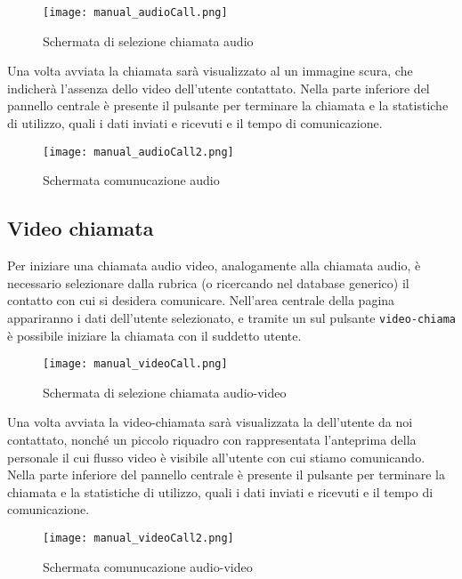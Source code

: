 \begin{figure}[H]
  \centering
  \texttt{[image: manual\_audioCall.png]}
\caption{Schermata di selezione chiamata audio}\label{fig:audioCall}
\end{figure}

Una volta avviata la chiamata sarà visualizzato al un immagine scura, che indicherà l'assenza dello  video dell'utente contattato. 
Nella parte inferiore del pannello centrale è presente il pulsante per terminare la chiamata e la statistiche di utilizzo, quali i dati inviati e ricevuti e il tempo di comunicazione.

\begin{figure}[H]
  \centering
  \texttt{[image: manual\_audioCall2.png]}
\caption{Schermata comunucazione audio}\label{fig:audioCall2}
\end{figure}

\clearpage

\subsection{Video chiamata}
Per iniziare una chiamata audio video, analogamente alla chiamata audio, è necessario selezionare dalla rubrica (o ricercando nel database generico) il contatto con cui si desidera comunicare. Nell'area centrale della pagina appariranno i dati dell'utente selezionato, e tramite un  sul pulsante 
\texttt{video-chiama} è possibile iniziare la chiamata con il suddetto utente.

\begin{figure}[H]
  \centering
  \texttt{[image: manual\_videoCall.png]}
\caption{Schermata di selezione chiamata audio-video}\label{fig:videoCall}
\end{figure}

Una volta avviata la video-chiamata sarà visualizzata la  dell'utente da noi contattato, nonché un piccolo riquadro con rappresentata l'anteprima della  personale il cui flusso video è visibile all'utente con cui stiamo comunicando. 
Nella parte inferiore del pannello centrale è presente il pulsante per terminare la chiamata e la statistiche di utilizzo, quali i dati inviati e ricevuti e il tempo di comunicazione.

\begin{figure}[H]
  \centering
  \texttt{[image: manual\_videoCall2.png]}
\caption{Schermata comunucazione audio-video}\label{fig:videoCall2}
\end{figure}

